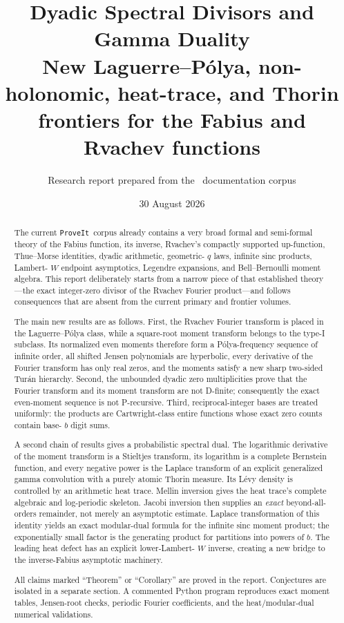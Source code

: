 \documentclass[11pt]{article}
\title{\bfseries Dyadic Spectral Divisors and Gamma Duality\\[0.35em]
\large New Laguerre--P\'olya, non-holonomic, heat-trace, and Thorin frontiers for the Fabius and Rvachev functions}
\author{Research report prepared from the \repo\ documentation corpus}
\date{30 August 2026}
\theoremstyle{definition}
\theoremstyle{remark}
\newcommand{\repo}{\texttt{ProveIt}}
\begin{document}
\maketitle

\begin{abstract}
The current \repo\ corpus already contains a very broad formal and semi-formal theory of the Fabius function, its inverse, Rvachev's compactly supported up-function, Thue--Morse identities, dyadic arithmetic, geometric-
\(q\) laws, infinite sinc products, Lambert-
\(W\) endpoint asymptotics, Legendre expansions, and Bell--Bernoulli moment algebra.  This report deliberately starts from a narrow piece of that established theory---the exact integer-zero divisor of the Rvachev Fourier product---and follows consequences that are absent from the current primary and frontier volumes.

The main new results are as follows.  First, the Rvachev Fourier transform is placed in the Laguerre--P\'olya class, while a square-root moment transform belongs to the type-I subclass.  Its normalized even moments therefore form a P\'olya-frequency sequence of infinite order, all shifted Jensen polynomials are hyperbolic, every derivative of the Fourier transform has only real zeros, and the moments satisfy a new sharp two-sided Tur\'an hierarchy.  Second, the unbounded dyadic zero multiplicities prove that the Fourier transform and its moment transform are not D-finite; consequently the exact even-moment sequence is not P-recursive.  Third, reciprocal-integer bases are treated uniformly: the products are Cartwright-class entire functions whose exact zero counts contain base-
\(b\) digit sums.

A second chain of results gives a probabilistic spectral dual.  The logarithmic derivative of the moment transform is a Stieltjes transform, its logarithm is a complete Bernstein function, and every negative power is the Laplace transform of an explicit generalized gamma convolution with a purely atomic Thorin measure.  Its L\'evy density is controlled by an arithmetic heat trace.  Mellin inversion gives the heat trace's complete algebraic and log-periodic skeleton.  Jacobi inversion then supplies an \emph{exact} beyond-all-orders remainder, not merely an asymptotic estimate.  Laplace transformation of this identity yields an exact modular-dual formula for the infinite sinc moment product; the exponentially small factor is the generating product for partitions into powers of \(b\).  The leading heat defect has an explicit lower-Lambert-
\(W\) inverse, creating a new bridge to the inverse-Fabius asymptotic machinery.

All claims marked ``Theorem'' or ``Corollary'' are proved in the report.  Conjectures are isolated in a separate section.  A commented Python program reproduces exact moment tables, Jensen-root checks, periodic Fourier coefficients, and the heat/modular-dual numerical validations.
\end{abstract}
\end{document}
